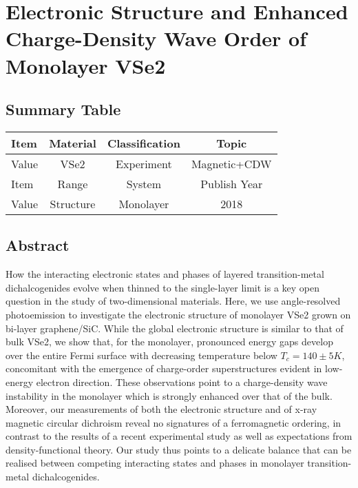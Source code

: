 \setchapterpreamble[u]{\margintoc}
\chapter{Electronic Structure and Enhanced Charge-Density Wave Order of Monolayer VSe2\cite{doi:10.1021/acs.nanolett.8b01649}}

\section{Summary Table}

\begin{table}[h]
    \begin{tabular}{lccc}
    \hline
    Item  & Material         & Classification & Topic        \\  \hline
    Value & VSe2             & Experiment     & Magnetic+CDW \\  \hline
    Item  & Range            & System         & Publish Year \\  \hline
    Value & Structure        & Monolayer      & 2018         \\  \hline
    \end{tabular}
\end{table}

\section{Abstract}
How the interacting electronic states and phases of layered transition-metal dichalcogenides evolve when thinned to the single-layer limit is a key open question in the study of two-dimensional materials. Here, we use angle-resolved photoemission to investigate the electronic structure of monolayer VSe2 grown on bi-layer graphene/SiC. While the global electronic structure is similar to that of bulk VSe2, we show that, for the monolayer, pronounced energy gaps develop over the entire Fermi surface with decreasing temperature below $T_c = 140 \pm 5 K$, concomitant with the emergence of charge-order superstructures evident in low-energy electron direction. These observations point to a charge-density wave instability in the monolayer which is strongly enhanced over that of the bulk. Moreover, our measurements of both the electronic structure and of x-ray magnetic circular dichroism reveal no signatures of a ferromagnetic ordering, in contrast to the results of a recent experimental study as well as expectations from density-functional theory. Our study thus points to a delicate balance that can be realised between competing interacting states and phases in monolayer transition-metal dichalcogenides.

